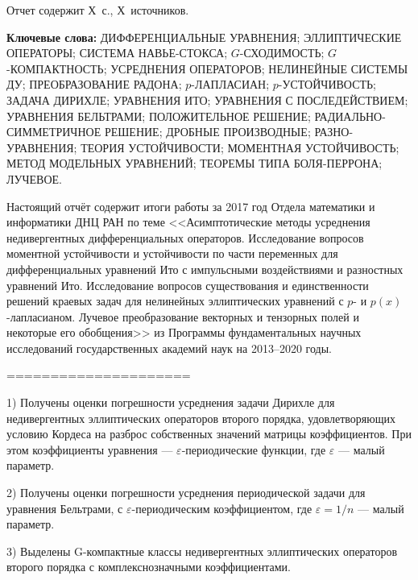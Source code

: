 \Referat %

Отчет содержит Х~с., Х~источников.%

\bigskip
\textbf{ Ключевые
	слова:}
ДИФФЕРЕНЦИАЛЬНЫЕ УРАВНЕНИЯ; ЭЛЛИПТИЧЕСКИЕ ОПЕРАТОРЫ; СИСТЕМА НАВЬЕ-СТОКСА; $G$-СХОДИМОСТЬ; $G$-КОМПАКТНОСТЬ; УСРЕДНЕНИЯ ОПЕРАТОРОВ; НЕЛИНЕЙНЫЕ СИСТЕМЫ ДУ;
ПРЕОБРАЗОВАНИЕ РАДОНА;
$p$-ЛАПЛАСИАН; $p$-УСТОЙЧИВОСТЬ; ЗАДАЧА ДИРИХЛЕ; УРАВНЕНИЯ ИТО; УРАВНЕНИЯ С ПОСЛЕДЕЙСТВИЕМ;  УРАВНЕНИЯ БЕЛЬТРАМИ; ПОЛОЖИТЕЛЬНОЕ РЕШЕНИЕ; РАДИАЛЬНО-СИММЕТРИЧНОЕ РЕШЕНИЕ; ДРОБНЫЕ ПРОИЗВОДНЫЕ; РАЗНО- УРАВНЕНИЯ;  ТЕОРИЯ УСТОЙЧИВОСТИ; МОМЕНТНАЯ УСТОЙЧИВОСТЬ; МЕТОД МОДЕЛЬНЫХ УРАВНЕНИЙ; ТЕОРЕМЫ ТИПА БОЛЯ-ПЕРРОНА; ЛУЧЕВОЕ.



\bigskip

Настоящий отчёт содержит итоги работы за 2017 год Отдела математики и информатики ДНЦ РАН по теме
<<Асимптотические методы усреднения недивергентных дифференциальных операторов. Исследование вопросов моментной устойчивости и устойчивости по части переменных для дифференциальных уравнений Ито с импульсными воздействиями и разностных уравнений Ито. Исследование вопросов существования и единственности решений краевых задач для нелинейных эллиптических уравнений с $p$- и $p(x)$-лапласианом. Лучевое преобразование векторных и тензорных полей и некоторые его обобщения>>
из Программы фундаментальных научных исследований государственных академий наук на 2013–2020 годы.


=====================



1) Получены оценки погрешности усреднения задачи Дирихле для недивергентных эллиптических операторов второго порядка, удовлетворяющих условию Кордеса на разброс собственных значений матрицы коэффициентов. При этом коэффициенты уравнения --- $\varepsilon$-периодические функции, где $\varepsilon$ --- малый параметр.

2) Получены оценки погрешности усреднения периодической задачи для уравнения Бельтрами, с $\varepsilon$-периодическим коэффициентом, где $\varepsilon=1/n$  --- малый параметр.

3) Выделены G-компактные классы недивергентных эллиптических операторов второго порядка с комплекснозначными коэффициентами.




